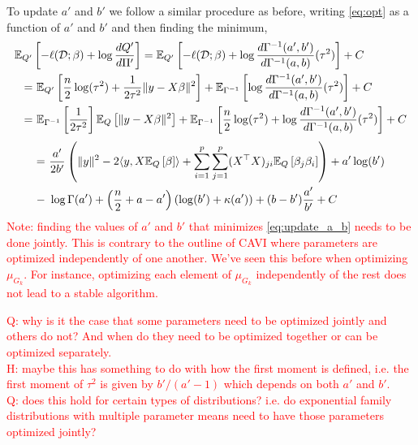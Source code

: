 \documentclass[12pt]{article}
\renewcommand{\red}[1]{\textcolor{red}{#1}}
\begin{document}
To update $a'$ and $b'$ we follow a similar procedure as before, writing \eqref{eq:opt} as a function of $a'$ and $b'$ and then finding the minimum,
\begin{align}
    \mathbb{E}_{Q'} & \left[ -\ell(\mathcal{D}; \beta) + \log \frac{dQ'}{d\Pi'} \right]
=  
    \mathbb{E}_{Q'} \left[
-
    \ell(\mathcal{D}; \beta)
+   
    \log \frac{d\Gamma^{-1}(a', b')}{d \Gamma^{-1}(a, b)}(\tau^2)\right] 
+
    C \nonumber \\
= &\
\mathbb{E}_{Q'} \left[ 
    \frac{n}{2}\log(\tau^2) 
+ 
    \frac{1}{2\tau^2} \| y - X \beta \|^2 
\right]
+
\mathbb{E}_{\Gamma^{-1}} \left[
    \log \frac{d\Gamma^{-1}(a', b')}{d \Gamma^{-1}(a, b)}(\tau^2)
\right] + C \nonumber \\
= &\
\mathbb{E}_{\Gamma^{-1}} \left[
    \frac{1}{2\tau^2}
\right]
\mathbb{E}_{Q} \left[ 
 \| y - X \beta \|^2 
\right]
+
\mathbb{E}_{\Gamma^{-1}} \left[
    \frac{n}{2}\log(\tau^2) 
+ 
    \log \frac{d\Gamma^{-1}(a', b')}{d \Gamma^{-1}(a, b)}(\tau^2)
\right] + C \nonumber
\end{align}
\begin{equation} \label{eq:update_a_b} 
\begin{aligned}
= & \
\frac{a'}{2 b'} \left( \| y \|^2 
    - 2 \langle y, X \mathbb{E}_Q \left[ \beta \right] \rangle
+  \sum_{i=1}^p \sum_{j=1}^p (X^\top X)_{ji} \mathbb{E}_Q \left[ \beta_j \beta_i \right]
\right)
+ a' \log (b')  \\
- &\
\log \Gamma(a') + \left( \frac{n}{2} + a-a' \right)(\log(b') + \kappa(a')) + (b - b')\frac{a'}{b'} + C
\end{aligned}
\end{equation}
\red{Note: finding the values of $a'$ and $b'$ that minimizes \eqref{eq:update_a_b} needs to be done jointly. This is contrary to the outline of CAVI where parameters are optimized independently of one another. We've seen this before when optimizing $\mu_{G_k}$. For instance, optimizing each element of $\mu_{G_k}$ independently of the rest does not lead to a stable algorithm.
}

\red{
Q: why is it the case that some parameters need to be optimized jointly and others do not? And when do they need to be optimized together or can be optimized separately. \\ 
H: maybe this has something to do with how the first moment is defined, i.e. the first moment of $\tau^2$ is given by $b' / (a' - 1)$ which depends on both $a'$ and $b'$. \\
Q: does this hold for certain types of distributions? i.e. do exponential family distributions with multiple parameter means need to have those parameters optimized jointly?
}
\end{document}
